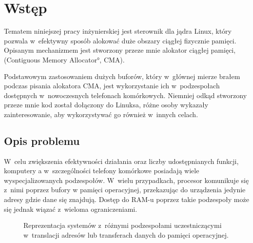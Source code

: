 \chapter{Wstęp}

Tematem niniejszej pracy inżynierskiej jest sterownik dla jądra Linux,
który pozwala w~efektywny sposób alokować duże obszary ciągłej
fizycznie pamięci.  Opisanym mechanizmem jest stworzony przeze mnie
alokator ciągłej pamięci, (\ang{Contiguous Memory Allocator}, CMA).

Podstawowym zastosowaniem dużych buforów, który w~głównej mierze
brałem podczas pisania alokatora CMA, jest wykorzystanie ich
w~podzespołach dostępnych w~nowoczesnych telefonach komórkowych.
Niemniej odkąd stworzony przeze mnie kod został dołączony do Linuksa,
różne osoby wykazały zainteresowanie, aby wykorzystywać go również
w~innych celach.


\section{Opis problemu}

W~celu zwiększenia efektywności działania oraz liczby udostępnianych
funkcji, komputery a w~szczególności telefony komórkowe posiadają
wiele wyspecjalizowanych podzespołów.  W~wielu przypadkach, procesor
komunikuje się z~nimi poprzez bufory w pamięci operacyjnej,
przekazując do urządzenia jedynie adresy gdzie dane się znajdują.
Dostęp do RAM-u poprzez takie podzespoły może się jednak wiązać
z~wieloma ograniczeniami.

\begin{figure}[tbp]
  \centering
   \qquad
  \qquad
  \caption[Różne przestrzenie adresowe dostępne
    w~komputerze.]{Reprezentacja systemów z~różnymi podzespołami
    uczestniczącymi w~translacji adresów lub transferach danych do
    pamięci operacyjnej.}
  \label{fig:mmu-iommu}
\end{figure}

